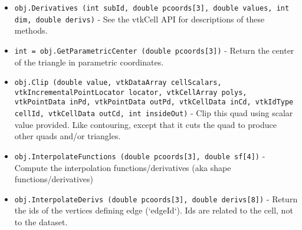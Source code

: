 \begin{itemize}
\item  \verb|obj.Derivatives (int subId, double pcoords[3], double values, int dim, double derivs)| -  See the vtkCell API for descriptions of these methods.

\item  \verb|int = obj.GetParametricCenter (double pcoords[3])| -  Return the center of the triangle in parametric coordinates.

\item  \verb|obj.Clip (double value, vtkDataArray cellScalars, vtkIncrementalPointLocator locator, vtkCellArray polys, vtkPointData inPd, vtkPointData outPd, vtkCellData inCd, vtkIdType cellId, vtkCellData outCd, int insideOut)| -  Clip this quad using scalar value provided. Like contouring, except
 that it cuts the quad to produce other quads and/or triangles.

\item  \verb|obj.InterpolateFunctions (double pcoords[3], double sf[4])| -  Compute the interpolation functions/derivatives
 (aka shape functions/derivatives)

\item  \verb|obj.InterpolateDerivs (double pcoords[3], double derivs[8])| -  Return the ids of the vertices defining edge (`edgeId`).
 Ids are related to the cell, not to the dataset.

\end{itemize}

